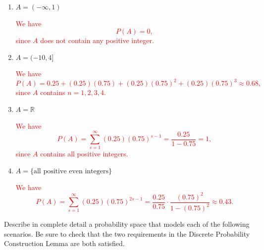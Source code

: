 \documentclass[12pt,reqno]{amsart}
\begin{document}
\medskip
\begin{enumerate}
\item $A = (-\infty,1)$
    
\bigskip
\textcolor{red}{We have
	\[
	P(A) = 0,
	\]
since $A$ does not contain any positive integer.}
\bigskip

\item $A = (-10, 4]$
    
\bigskip
\textcolor{red}{We have
	\[
	P(A) = 0.25 + (0.25)(0.75) + (0.25)(0.75)^2+ (0.25)(0.75)^3\approx 0.68,
	\]
since $A$ contains $n=1,2,3,4$.}
\bigskip

\item $A = \mathbb{R}$
    
\bigskip
\textcolor{red}{We have
        \[
        P(A) = \sum_{s=1}^\infty (0.25)(0.75)^{s-1} = \frac{0.25}{1-0.75} = 1,
        \]
    since $A$ contains all positive integers.}
\bigskip
    
\item $A = \{\text{all positive even integers}\}$
    
\bigskip
\textcolor{red}{We have
	\[
	P(A) = \sum_{s=1}^\infty (0.25)(0.75)^{2s-1} = \frac{0.25}{0.75} \cdot \frac{(0.75)^2}{1-(0.75)^2} \approx 0.43.
	\]}
\end{enumerate}
















\bigskip
\prob Describe in complete detail a probability space that models each of the following scenarios. Be sure to check that the two requirements in the Discrete Probability Construction Lemma are both satisfied.
\end{document}

